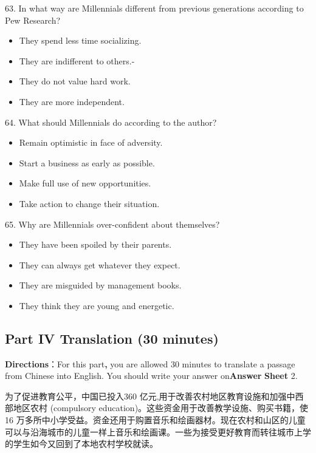 \documentclass[UTF8,11pt]{ctexart}
\begin{document}
63. In what way are Millennials different from previous generations according to Pew Research?


\begin{itemize}[leftmargin=2em,itemsep=.2em,topsep=.4em]\item[A.] They spend less time socializing.
\item[B.] They are indifferent to others.-
\item[C.] They do not value hard work.
\item[D.] They are more independent.
\end{itemize}

64. What should Millennials do according to the author?


\begin{itemize}[leftmargin=2em,itemsep=.2em,topsep=.4em]\item[A.] Remain optimistic in face of adversity.
\item[B.] Start a business as early as possible.
\item[C.] Make full use of new opportunities.
\item[D.] Take action to change their situation.
\end{itemize}

65. Why are Millennials over-confident about themselves?


\begin{itemize}[leftmargin=2em,itemsep=.2em,topsep=.4em]\item[A.] They have been spoiled by their parents.
\item[B.] They can always get whatever they expect.
\item[C.] They are misguided by management books.
\item[D.] They think they are young and energetic.
\end{itemize}

\subsection*{\textbf{Part IV} \textbf{Translation} \textbf{(30 minutes)}}


\textbf{Directions}：For this part\textbf{,} you are allowed 30 minutes to translate a passage from Chinese into English. You should write your answer on\textbf{Answer} \textbf{Sheet} 2.


为了促进教育公平，中国已投入360 亿元,用于改善农村地区教育设施和加强中西部地区农村 (compulsory education)。这些资金用于改善教学设施、购买书籍，使16 万多所中小学受益。资金还用于购置音乐和绘画器材。现在农村和山区的儿童可以与沿海城市的儿童一样上音乐和绘画课。一些为接受更好教育而转往城市上学的学生如今又回到了本地农村学校就读。
\end{document}
